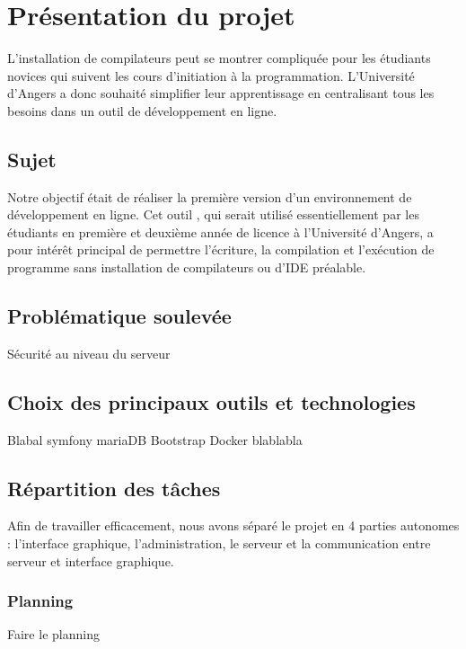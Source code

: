 \chapter{Présentation du projet}

\par L'installation de compilateurs peut se montrer compliquée pour les étudiants novices qui suivent les cours d'initiation à la programmation. L'Université d'Angers a donc souhaité simplifier leur apprentissage en centralisant tous les besoins dans un outil de développement en ligne.

\section{Sujet}

\par Notre objectif était de réaliser la première version d'un environnement de développement en ligne. Cet outil , qui serait utilisé essentiellement par les étudiants en première et deuxième année de licence à l'Université d'Angers, a pour intérêt principal de permettre l’écriture, la compilation et l’exécution de programme sans installation de compilateurs ou d'IDE préalable.

\section{Problématique soulevée}

Sécurité au niveau du serveur

\section{Choix des principaux outils et technologies}

Blabal symfony mariaDB Bootstrap Docker blablabla

\section{Répartition des tâches}

\par Afin de travailler efficacement, nous avons séparé le projet en 4 parties autonomes : l'interface graphique, l'administration, le serveur et la communication entre serveur et interface graphique.

\subsection{Planning}

Faire le planning